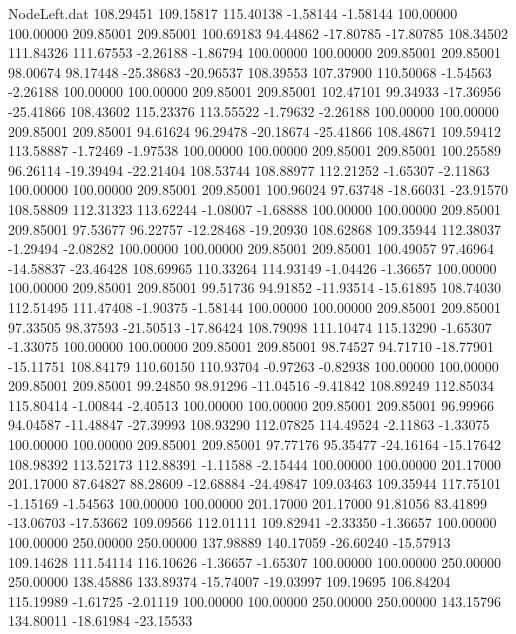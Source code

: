 \begin{filecontents}{NodeLeft.dat}
 108.29451  109.15817  115.40138    -1.58144   -1.58144  100.00000  100.00000  209.85001  209.85001  100.69183   94.44862  -17.80785  -17.80785
 108.34502  111.84326  111.67553    -2.26188   -1.86794  100.00000  100.00000  209.85001  209.85001   98.00674   98.17448  -25.38683  -20.96537
 108.39553  107.37900  110.50068    -1.54563   -2.26188  100.00000  100.00000  209.85001  209.85001  102.47101   99.34933  -17.36956  -25.41866
 108.43602  115.23376  113.55522    -1.79632   -2.26188  100.00000  100.00000  209.85001  209.85001   94.61624   96.29478  -20.18674  -25.41866
 108.48671  109.59412  113.58887    -1.72469   -1.97538  100.00000  100.00000  209.85001  209.85001  100.25589   96.26114  -19.39494  -22.21404
 108.53744  108.88977  112.21252    -1.65307   -2.11863  100.00000  100.00000  209.85001  209.85001  100.96024   97.63748  -18.66031  -23.91570
 108.58809  112.31323  113.62244    -1.08007   -1.68888  100.00000  100.00000  209.85001  209.85001   97.53677   96.22757  -12.28468  -19.20930
 108.62868  109.35944  112.38037    -1.29494   -2.08282  100.00000  100.00000  209.85001  209.85001  100.49057   97.46964  -14.58837  -23.46428
 108.69965  110.33264  114.93149    -1.04426   -1.36657  100.00000  100.00000  209.85001  209.85001   99.51736   94.91852  -11.93514  -15.61895
 108.74030  112.51495  111.47408    -1.90375   -1.58144  100.00000  100.00000  209.85001  209.85001   97.33505   98.37593  -21.50513  -17.86424
 108.79098  111.10474  115.13290    -1.65307   -1.33075  100.00000  100.00000  209.85001  209.85001   98.74527   94.71710  -18.77901  -15.11751
 108.84179  110.60150  110.93704    -0.97263   -0.82938  100.00000  100.00000  209.85001  209.85001   99.24850   98.91296  -11.04516   -9.41842
 108.89249  112.85034  115.80414    -1.00844   -2.40513  100.00000  100.00000  209.85001  209.85001   96.99966   94.04587  -11.48847  -27.39993
 108.93290  112.07825  114.49524    -2.11863   -1.33075  100.00000  100.00000  209.85001  209.85001   97.77176   95.35477  -24.16164  -15.17642
 108.98392  113.52173  112.88391    -1.11588   -2.15444  100.00000  100.00000  201.17000  201.17000   87.64827   88.28609  -12.68884  -24.49847
 109.03463  109.35944  117.75101    -1.15169   -1.54563  100.00000  100.00000  201.17000  201.17000   91.81056   83.41899  -13.06703  -17.53662
 109.09566  112.01111  109.82941    -2.33350   -1.36657  100.00000  100.00000  250.00000  250.00000  137.98889  140.17059  -26.60240  -15.57913
 109.14628  111.54114  116.10626    -1.36657   -1.65307  100.00000  100.00000  250.00000  250.00000  138.45886  133.89374  -15.74007  -19.03997
 109.19695  106.84204  115.19989    -1.61725   -2.01119  100.00000  100.00000  250.00000  250.00000  143.15796  134.80011  -18.61984  -23.15533

\end{filecontents}

